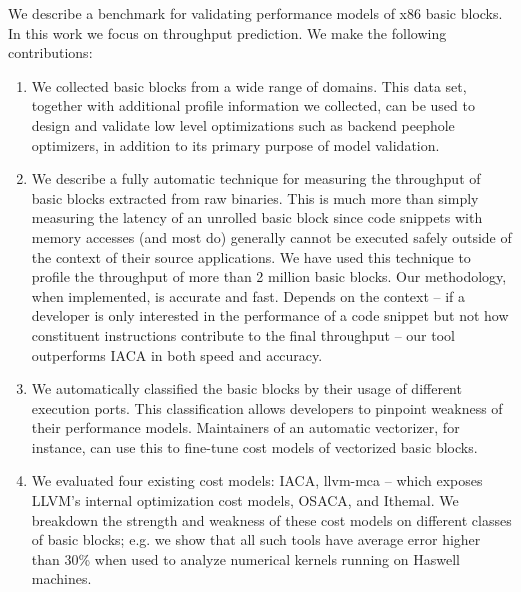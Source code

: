 We describe a benchmark for validating performance models
of x86 basic blocks.
In this work we focus on throughput prediction.
We make the following contributions:
\begin{enumerate}
\item We collected basic blocks from a wide range of domains.
This data set, together with additional profile information we collected,
can be used to design and validate low level optimizations
such as backend peephole optimizers,
in addition to its primary purpose of model validation.

\item We describe a fully automatic technique
for measuring the throughput of basic blocks extracted 
from raw binaries.
This is much more than simply measuring the latency of an unrolled basic block
since code snippets with memory accesses (and most do)
generally cannot be executed safely
outside of the context of their source applications.
We have used this technique to profile the throughput of more than 2 million basic blocks.
Our methodology, when implemented, is accurate and fast.
Depends on the context -- 
if a developer is only interested in the performance of a code snippet
but not how constituent instructions contribute to the final
throughput -- our tool outperforms IACA in both speed and accuracy.

\item We automatically classified the basic blocks
by their usage of different execution ports.
This classification allows developers to pinpoint weakness
of their performance models.
Maintainers of an automatic vectorizer, for instance,
can use this to fine-tune cost models
of vectorized basic blocks.

\item We evaluated four existing cost models:
IACA, llvm-mca -- 
which exposes LLVM’s internal optimization cost models,
OSACA\cite{osaca}, and Ithemal\cite{ithemal}.
We breakdown the strength and weakness of these cost models on
different classes of basic blocks;
e.g. we show that all such tools
have average error higher than 30\% 
when used to analyze numerical kernels running on Haswell machines.



\end{enumerate}